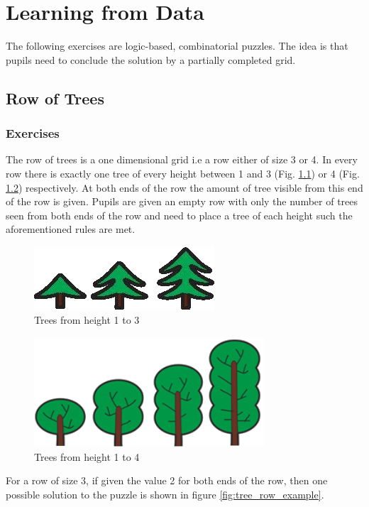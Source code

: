 \chapter{Learning from Data}
\label{chapter:learningFromData}

The following exercises are logic-based, combinatorial puzzles. The idea is that pupils need to conclude the solution by a partially completed grid.

\section{Row of Trees}
\label{section:treeRow}

\subsection{Exercises}
The row of trees is a one dimensional grid i.e a row either of size 3 or 4. In every row there is exactly one tree of every height between 1 and 3 (Fig. \ref{fig:trees_3}) or 4 (Fig. \ref{fig:trees_4}) respectively. At both ends of the row the amount of tree visible from this end of the row is given.
Pupils are given an empty row with only the number of trees seen from both ends of the row and need to place a tree of each height such the aforementioned rules are met.

\begin{figure} 
    \centering
    \includegraphics[width=0.4 \columnwidth]{figures/trees_3.png}
    \caption{Trees from height 1 to 3} 
    \label{fig:trees_3} 
\end{figure}

\begin{figure} 
    \centering
    \includegraphics[width=0.4 \columnwidth]{figures/trees_4.png}
    \caption{Trees from height 1 to 4} 
    \label{fig:trees_4} 
\end{figure}

\begin{example}
    For a row of size 3, if given the value 2 for both ends of the row, then one possible solution to the puzzle is shown in figure \ref{fig:tree_row_example}.
\end{example}

